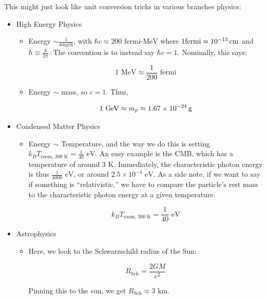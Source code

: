 \documentclass{article}
\newcommand{\unit}[1]{{\,\rm #1}}
\newcommand{\g}{\unit{g}}
\newcommand{\cm}{\unit{cm}}
\begin{document}
This might just look like unit conversion tricks in various branches physics:

\begin{itemize}
    \item High Energy Physics
    \begin{itemize}
        \item Energy $\sim \frac{1}{\text{length}}$, with $\hbar c \approx 200 \text{ fermi-MeV}$ where $1 \text{fermi} = 10^{-13} \cm$ and $\hbar \equiv \frac{h}{2\pi}$. The convention is to instead say $\hbar c =1$. Nominally, this says:
        
        $$
        1 \text{ MeV} \approx \frac{1}{200} \text{ fermi}
        $$
        
        \item Energy $\sim$ mass, so $c = 1$. Thus, 
        
        $$
        1 \text{ GeV} \approx m_p \approx 1.67\times 10^{-24} \g
        $$
    \end{itemize}
    
    \item Condensed Matter Physics 
    \begin{itemize}
        \item Energy $\sim$ Temperature, and the way we do this is setting $k_B T_{\text{room, }300\text{ K}} = \frac{1}{40} \text{ eV}$. An easy example is the CMB, which has a temperature of around $3 \text{ K}$. Immediately, the characteristic photon energy is thus $\frac{1}{4000} \text{ eV}$, or around $2.5 \times 10^{-4} \text{ eV}$. As a side note, if we want to say if something is ``relativistic,'' we have to compare the particle's rest mass to the characteristic photon energy at a given temperature. 
        
        $$
        k_B T_{\text{room, }300\text{ K}} = \frac{1}{40} \text{ eV}
        $$
    \end{itemize}
    
    \item Astrophysics
    \begin{itemize}
        \item Here, we look to the Schwarzschild radius of the Sun:
        
        $$
        R_\text{Sch} = \frac{2GM}{c^2}
        $$
        
        Pinning this to the sun, we get $R_\text{Sch} \approx 3 \text{ km}$. 
    \end{itemize}
\end{itemize}
\end{document}
